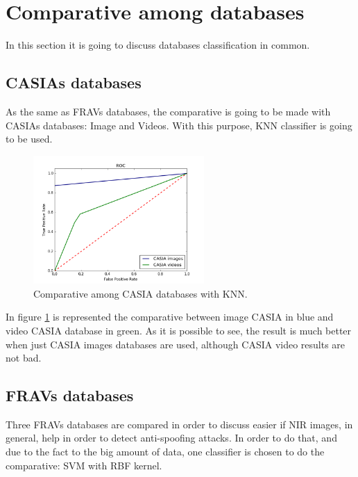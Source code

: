 \section{Comparative among databases}
In this section it is going to discuss databases classification in common.

\subsection{CASIAs databases}
As the same as FRAVs databases, the comparative is going to be made with CASIAs databases: Image and Videos. With this purpose, KNN classifier is going to be used.\\

\begin{figure}[htb]
\centering
\includegraphics[width=0.58\textwidth]{images/comparative/CASIAs_KNN_ROC.png}
\caption{Comparative among CASIA databases with KNN.} \label{fig:CASIAS_KNN_comparative}
\end{figure}

In figure \ref{fig:CASIAS_KNN_comparative} is represented the comparative between image CASIA in blue and video CASIA database in green. As it is possible to see, the result is much better when just CASIA images databases are used, although CASIA video results are not bad.\\

\subsection{FRAVs databases}
Three FRAVs databases are compared in order to discuss easier if NIR images, in general, help in order to detect anti-spoofing attacks. In order to do that, and due to the fact to the big amount of data, one classifier is chosen to do the comparative: SVM with RBF kernel.\\

